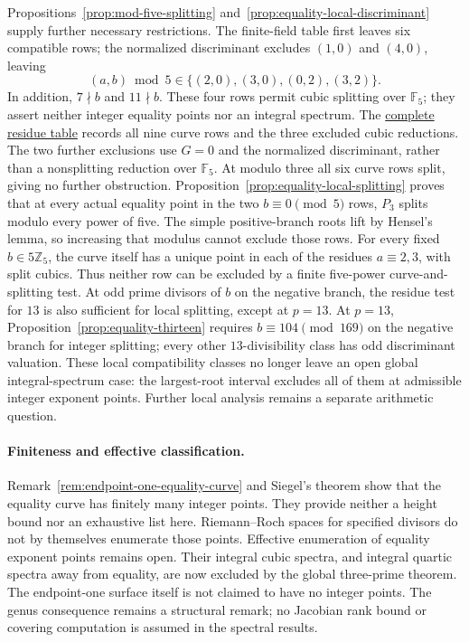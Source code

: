 Propositions~\ref{prop:mod-five-splitting}
and~\ref{prop:equality-local-discriminant} supply further necessary
restrictions. The finite-field table first leaves six compatible rows;
the normalized discriminant excludes $(1,0)$ and $(4,0)$, leaving
\[
 (a,b)\bmod5\in\{(2,0),(3,0),(0,2),(3,2)\}.
\]
In addition, $7\nmid b$ and $11\nmid b$. These four rows permit cubic
splitting over $\mathbb F_5$; they assert neither integer equality points
nor an integral spectrum. The
\href{https://github.com/the-omega-institute/ideal-intersection-laplacian/blob/7d917afffd7c2616bc052810718dcc720d916a8b/notes/endpoint-one-equality-mod-five.md}{complete residue table}
records all nine curve rows and the three excluded cubic reductions.
The two further exclusions use $G=0$ and the normalized discriminant,
rather than a nonsplitting reduction over $\mathbb F_5$.
At modulo three all six curve rows split, giving no further obstruction.
Proposition~\ref{prop:equality-local-splitting} proves that at every
actual equality point in the two $b\equiv0\pmod5$ rows, $P_3$ splits
modulo every power of five. The simple positive-branch roots lift by
Hensel's lemma, so increasing that modulus cannot exclude those rows.
For every fixed $b\in5\mathbb Z_5$, the curve itself has a unique point
in each of the residues $a\equiv2,3$, with split cubics. Thus neither
row can be excluded by a finite five-power curve-and-splitting test.
At odd prime divisors of $b$ on the negative branch, the residue test
for $13$ is also sufficient for local splitting, except at $p=13$.
At $p=13$, Proposition~\ref{prop:equality-thirteen} requires
$b\equiv104\pmod{169}$ on the negative branch for integer splitting;
every other $13$-divisibility class has odd discriminant valuation.
These local compatibility classes no longer leave an open global
integral-spectrum case: the largest-root interval excludes all of them
at admissible integer exponent points. Further local analysis remains
a separate arithmetic question.

\paragraph{Finiteness and effective classification.}
Remark~\ref{rem:endpoint-one-equality-curve} and Siegel's theorem show
that the equality curve has finitely many integer points. They provide
neither a height bound nor an exhaustive list here. Riemann--Roch spaces
for specified divisors do not by themselves enumerate those points.
Effective enumeration of equality exponent points remains open.
Their integral cubic spectra, and integral quartic spectra away from
equality, are now excluded by the global three-prime theorem.
The endpoint-one surface itself is not claimed to have no integer points.
The genus consequence remains a structural remark; no Jacobian rank
bound or covering computation is assumed in the spectral results.

